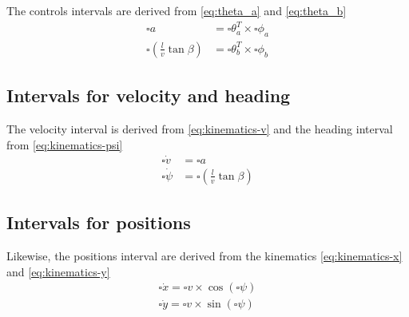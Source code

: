 \documentclass{article}
\newcommand{\interval}[1]{\square #1}
\begin{document}
The controls intervals are derived from \eqref{eq:theta_a} and \eqref{eq:theta_b}
\begin{align}
\interval{a} &= \interval{\theta_a}^T \times \interval{\phi_a} \\
\interval{\left(\frac{l}{v}\tan\beta\right)} &= \interval{\theta_b}^T \times \interval{\phi_b}
\end{align}

\subsection{Intervals for velocity and heading}
The velocity interval is derived from \eqref{eq:kinematics-v} and the heading interval from \eqref{eq:kinematics-psi}
\begin{align}
\interval{\dot{v}} &= \interval{a} \\
\interval{\dot{\psi}} &= \interval{\left(\frac{l}{v}\tan\beta\right)}
\end{align}

\subsection{Intervals for positions}
Likewise, the positions interval are derived from the kinematics \eqref{eq:kinematics-x} and \eqref{eq:kinematics-y}
\begin{align}
\interval{\dot{x}} = \interval{v} \times \cos(\interval{\psi})\\
\interval{\dot{y}} = \interval{v} \times \sin(\interval{\psi})
\end{align}

\end{document}
